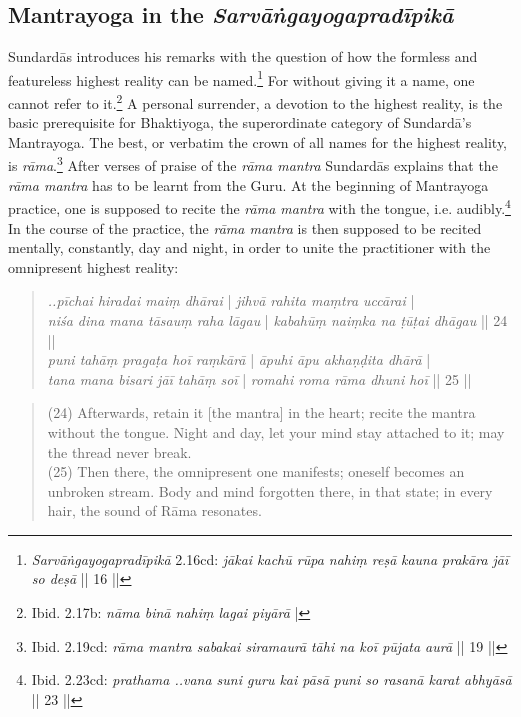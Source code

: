\subsection{Mantrayoga in the \textit{Sarvāṅgayogapradīpikā}}
\label{mantrayogaintrosarva}

Sundardās introduces his remarks with the question of how the formless and featureless highest reality can be named.\footnote{\textit{Sarvāṅgayogapradīpikā} 2.16cd: \textit{jākai kachū rūpa nahiṃ reṣā} \textit{kauna prakāra jāī so deṣā} || 16 ||} For without giving it a name, one cannot refer to it.\footnote{Ibid. 2.17b: \textit{nāma binā nahiṃ lagai piyārā} |} A personal surrender, a devotion to the highest reality, is the basic prerequisite for Bhaktiyoga, the superordinate category of Sundardā's Mantrayoga. The best, or verbatim the crown of all names for the highest reality, is \textit{rāma}.\footnote{Ibid. 2.19cd: \textit{rāma mantra sabakai siramaurā} \textit{tāhi na koī pūjata aurā} || 19 ||} After verses of praise of the \textit{rāma mantra} Sundardās explains that the \textit{rāma mantra} has to be learnt from the Guru. At the beginning of Mantrayoga practice, one is supposed to recite the \textit{rāma mantra} with the tongue, i.e. audibly.\footnote{Ibid. 2.23cd: \textit{prathama ..vana suni guru kai pāsā} \textit{puni so rasanā karat abhyāsā} || 23 ||} In the course of the practice, the \textit{rāma mantra} is then supposed to be recited mentally, constantly, day and night, in order to unite the practitioner with the omnipresent highest reality:

\begin{quote}
\textit{..pīchai hiradai maiṃ dhārai} | \textit{jihvā rahita maṃtra uccārai} |\\ 
\textit{niśa dina mana tāsauṃ raha lāgau} | \textit{kabahūṃ naiṃka na ṭūṭai dhāgau} || 24 ||\\
\textit{puni tahāṃ pragaṭa hoī raṃkārā} | \textit{āpuhi āpu akhaṇḍita dhārā} |\\
\textit{tana mana bisari jāī tahāṃ soī} | \textit{romahi roma rāma dhuni hoī} || 25 ||\\
\end{quote}
\begin{quote}
(24) Afterwards, retain it [the mantra] in the heart; recite the mantra without the tongue.
Night and day, let your mind stay attached to it; may the thread never break.\\
(25) Then there, the omnipresent one manifests; oneself becomes an unbroken stream.
Body and mind forgotten there, in that state; in every hair, the sound of Rāma resonates.
\end{quote}

